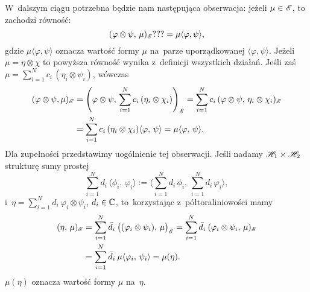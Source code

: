 \documentclass[a4paper,11pt]{article}
\begin{document}
W~dalszym ciągu potrzebna będzie nam następująca obserwacja: jeżeli
$\mu \in \mathcal{E}$, to zachodzi równość:
\begin{equation}
  \label{eq:RS-Vol-I-s01-32}
  ( \varphi \otimes \psi, \, \mu )_{ \mathcal{E} } ??? = \mu\langle \varphi, \psi \rangle,
\end{equation}
gdzie $\mu\langle \varphi,  \psi \rangle$ oznacza wartość formy $\mu$ na~parze
uporządkowanej $\langle \varphi, \psi \rangle$. Jeżeli $\mu = \eta \otimes \chi$ to
powyższa równość wynika z~definicji wszystkich działań. Jeśli zaś
$\mu = \sum_{ i = 1 }^{ N } c_{ i } \, ( \eta_{ i } \otimes \psi_{ i } )$,
wówczas
\begin{equation}
  \label{eq:RS-Vol-I-s01-33}
  \begin{split}
    ( \varphi \otimes \psi, \mu )_{ \mathcal{E} }
    &=
      \left( \varphi \otimes \psi, \, \sum_{ i = 1 }^{ N } c_{ i } \,
      ( \eta_{ i } \otimes \chi_{ i } ) \right)_{ \mathcal{E} }
      =
      \sum_{ i = 1 }^{ N } c_{ i } \, ( \varphi \otimes \psi, \, \eta_{ i } \otimes \chi_{ i } )_{ \mathcal{E} } \\
    &=
      \sum_{ i = 1 }^{ N } c_{ i } \, ( \eta_{ i } \otimes \chi_{ i } )
      \langle \varphi, \, \psi \rangle
      = \mu\langle \varphi, \, \psi \rangle.
  \end{split}
\end{equation}
Dla zupełności przedstawimy uogólnienie tej obserwacji. Jeśli nadamy
$\mathcal{H}_{ 1 } \times \mathcal{H}_{ 2 }$ strukturę sumy prostej
\begin{equation}
  \label{eq:RS-Vol-I-s01-34}
  \sum_{ i = 1 }^{ N } d_{ i } \, \langle \phi_{ i }, \, \varphi_{ i } \rangle
  :=
  \langle \sum_{ i = 1 }^{ N } d_{ i } \, \phi_{ i }, \,
  \sum_{ i = 1 }^{ N } d_{ i } \, \varphi_{ i } \rangle,
\end{equation}
i~$\eta = \sum_{ i = 1 }^{ N } d_{ i } \: \varphi_{ i } \otimes \psi_{ i }$,
$d_{ i } \in \mathbb{C}$, to~korzystając z~półtoraliniowości mamy
\begin{equation}
  \label{eq:RS-Vol-I-s01-35}
  \begin{split}
    ( \eta, \, \mu )_{ \mathcal{E} }
    &=
      \sum_{ i = 1 }^{ N } \bar{ d }_{ i } \:
      \big( ( \varphi_{ i } \otimes \psi_{ i } ), \, \mu \big)_{ \mathcal{E} }
      =
      \sum_{ i = 1 }^{ N } \bar{ d }_{ i } \:
    ( \varphi_{ i } \otimes \psi_{ i }, \, \mu )_{ \mathcal{E} } \\
    &=
      \sum_{ i = 1 }^{ N } \bar{ d }_{ i } \: \mu \langle \varphi_{ i }, \, \psi_{ i } \rangle
      = \mu( \eta ).
  \end{split}
\end{equation}
$\mu( \eta )$ oznacza wartość formy $\mu$ na~$\eta$.
\end{document}
